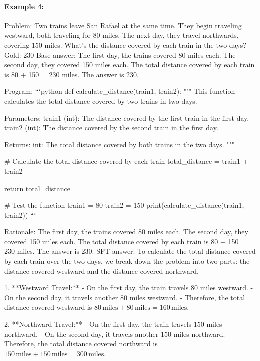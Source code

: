 \documentclass[11pt]{article}
\begin{document}
\paragraph{Example 4:}
\begin{answerbox}
Problem: Two trains leave San Rafael at the same time. They begin traveling westward, both traveling for 80 miles. The next day, they travel northwards, covering 150 miles. What's the distance covered by each train in the two days?
Gold: 230
Base answer:
The first day, the trains covered 80 miles each. The second day, they covered 150 miles each. The total distance covered by each train is 80 + 150 = 230 miles. The answer is 230.

Program:
```python
def calculate_distance(train1, train2):
    """
    This function calculates the total distance covered by two trains in two days.
    
    Parameters:
    train1 (int): The distance covered by the first train in the first day.
    train2 (int): The distance covered by the second train in the first day.
    
    Returns:
    int: The total distance covered by both trains in the two days.
    """
    
    # Calculate the total distance covered by each train
    total_distance = train1 + train2
    
    return total_distance

# Test the function
train1 = 80
train2 = 150
print(calculate_distance(train1, train2))
```

Rationale:
The first day, the trains covered 80 miles each. The second day, they covered 150 miles each. The total distance covered by each train is 80 + 150 = 230 miles. The answer is 230.
SFT answer:
To calculate the total distance covered by each train over the two days, we break down the problem into two parts: the distance covered westward and the distance covered northward.

1. **Westward Travel:**
   - On the first day, the train travels 80 miles westward.
   - On the second day, it travels another 80 miles westward.
   - Therefore, the total distance covered westward is $80 \, \text{miles} + 80 \, \text{miles} = 160 \, \text{miles}$.

2. **Northward Travel:**
   - On the first day, the train travels 150 miles northward.
   - On the second day, it travels another 150 miles northward.
   - Therefore, the total distance covered northward is $150 \, \text{miles} + 150 \, \text{miles} = 300 \, \text{miles}$.


\end{answerbox}
\end{document}
